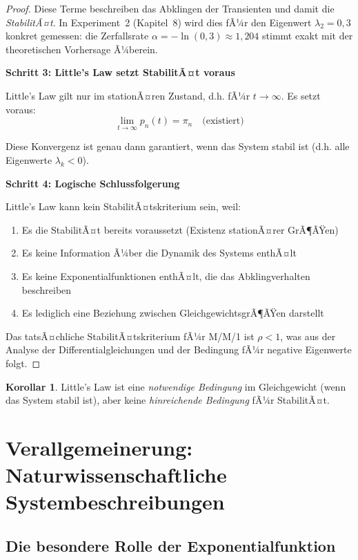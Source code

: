 ﻿\documentclass[a4paper,12pt]{report}
\theoremstyle{definition}
\newtheorem{korollar}{Korollar}[section]
\begin{document}
\begin{proof}
	Diese Terme beschreiben das Abklingen der Transienten und damit
	die \textit{StabilitÃ¤t}.  In Experiment~2 (Kapitel~8) wird dies fÃ¼r den
	Eigenwert $\lambda_2 = 0{,}3$ konkret gemessen: die Zerfallsrate
	$\alpha = -\ln(0{,}3) \approx 1{,}204$ stimmt exakt mit der theoretischen
	Vorhersage Ã¼berein.
	
	\textbf{Schritt 3: Little's Law setzt StabilitÃ¤t voraus}
	
	Little's Law gilt nur im stationÃ¤ren Zustand, d.h. fÃ¼r $t \to \infty$. Es setzt voraus:
	\begin{equation}
		\lim_{t \to \infty} p_n(t) = \pi_n \quad \text{(existiert)}
	\end{equation}
	
	Diese Konvergenz ist genau dann garantiert, wenn das System stabil ist (d.h. alle Eigenwerte $\lambda_k < 0$). 
	
	\textbf{Schritt 4: Logische Schlussfolgerung}
	
	Little's Law kann kein StabilitÃ¤tskriterium sein, weil:
	\begin{enumerate}
		\item[-] Es die StabilitÃ¤t bereits voraussetzt (Existenz stationÃ¤rer GrÃ¶ÃŸen)
		\item[-] Es keine Information Ã¼ber die Dynamik des Systems enthÃ¤lt
		\item[-] Es keine Exponentialfunktionen enthÃ¤lt, die das Abklingverhalten beschreiben
		\item[-] Es lediglich eine Beziehung zwischen GleichgewichtsgrÃ¶ÃŸen darstellt
	\end{enumerate}
	
	Das tatsÃ¤chliche StabilitÃ¤tskriterium fÃ¼r M/M/1 ist $\rho < 1$, was aus der Analyse der Differentialgleichungen und der Bedingung fÃ¼r negative Eigenwerte folgt.
\end{proof}

\begin{korollar}
	Little's Law ist eine \textit{notwendige Bedingung} im Gleichgewicht (wenn das System stabil ist), aber keine \textit{hinreichende Bedingung} fÃ¼r StabilitÃ¤t.
\end{korollar}

\section{Verallgemeinerung: Naturwissenschaftliche Systembeschreibungen}

\subsection{Die besondere Rolle der Exponentialfunktion}
\end{document}
